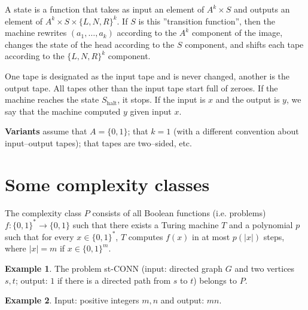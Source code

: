 \documentclass{article}
\theoremstyle{definition}
\newtheorem{example}{Example}[section]
\begin{document}
A state is a function that takes as input an element of $A^k \times S$ and outputs an element of $A^k \times S \times \{L, N, R\}^k$. If $S$ is this ''transition function'', then the machine rewrites $(a_1,\ldots,a_k)$ according to the $A^k$ component of the image, changes the state of the head according to the $S$ component, and shifts each tape according to the $\{L,N,R\}^k$ component.
\vspace{1mm}
 
One tape is designated as the input tape and is never changed, another is the output tape. All tapes other than the input tape start full of zeroes. If the machine reaches the state $S_{\text{halt}}$, it stops. If the input is $x$ and the output is $y$, we say that the machine computed $y$ given input $x$.
\vspace{1mm}
 
\textbf{Variants} assume that $A = \{0,1\}$; that $k=1$ (with a different convention about input--output tapes); that tapes are two--sided, etc.

\section{Some complexity classes}

The complexity class $P$ consists of all Boolean functions (i.e. problems) $f: \{0,1\}^* \to \{0,1\}$ such that there exists a Turing machine $T$ and a polynomial $p$ such that for every $x \in \{0,1\}^*$, $T$ computes $f(x)$ in at most $p(|x|)$ steps, where $|x| = m$ if $x \in \{0,1\}^m$.

\begin{example}
    The problem st-CONN (input: directed graph $G$ and two vertices $s,t$; output: $1$ if there is a directed path from $s$ to $t$) belongs to $P$.
\end{example}
\begin{example}
    Input: positive integers $m,n$ and output: $mn$.
\end{example}
\end{document}
